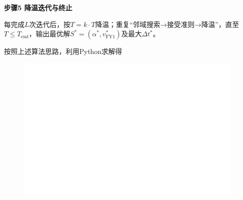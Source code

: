 \documentclass[../main.tex]{subfiles}
\begin{document}
\noindent\textbf{步骤5 降温迭代与终止}

每完成$L$次迭代后，按$T = k \cdot T$降温；重复“邻域搜索→接受准则→降温”，直至$T \leq T_{\text{end}}$，输出最优解$S^*=(\alpha^*, v_{\text{FY1}}^*)$及最大$\Delta t^*$。

按照上述算法思路，利用Python求解得


\begin{figure}[H]
\centering
\includegraphics[scale=0.5]{标记图.png}
\caption{}
\label{图3}
\end{figure}
\end{document}
